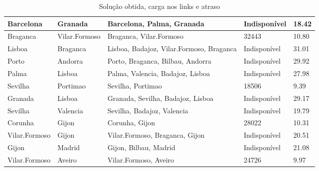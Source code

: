 \begin{table}[!htb]
{\begin{tabular}{|l|l|l|l|l|}
Barcelona & Granada & Barcelona, Palma, Granada & Indisponível & 18.42 \\ \hline
Braganca & Vilar.Formoso & Braganca, Vilar.Formoso & 32443 & 10.80 \\ \hline
Lisboa & Braganca & Lisboa, Badajoz, Vilar.Formoso, Braganca & Indisponível & 31.01 \\ \hline
Porto & Andorra & Porto, Braganca, Bilbau, Andorra & Indisponível & 29.92 \\ \hline
Palma & Lisboa & Palma, Valencia, Badajoz, Lisboa & Indisponível & 27.98 \\ \hline
Sevilha & Portimao & Sevilha, Portimao & 18506 & 9.39 \\ \hline
Granada & Lisboa & Granada, Sevilha, Badajoz, Lisboa & Indisponível & 29.17 \\ \hline
Sevilha & Valencia & Sevilha, Badajoz, Valencia & Indisponível & 19.79 \\ \hline
Corunha & Gijon & Corunha, Gijon & 28022 & 10.31 \\ \hline
Vilar.Formoso & Gijon & Vilar.Formoso, Braganca, Gijon & Indisponível & 20.51 \\ \hline
Gijon & Madrid & Gijon, Bilbau, Madrid & Indisponível & 21.08 \\ \hline
Vilar.Formoso & Aveiro & Vilar.Formoso, Aveiro & 24726 & 9.97 \\ \hline
\end{tabular}}
\caption[]{Solução obtida, carga nos links e atraso}
\end{table}

\begin{table}[!htb]
        \centering
\caption[]{Solução obtida, carga nos links e atraso}
\end{table}


